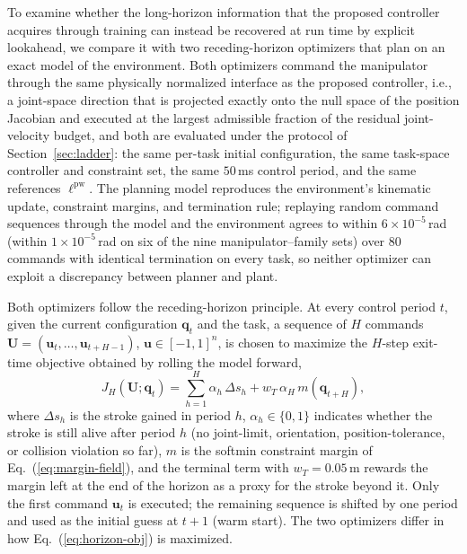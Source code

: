 \documentclass[journal, twoside]{IEEEtran}
\begin{document}
To examine whether the long-horizon information that the proposed
controller acquires through training can instead be recovered at run
time by explicit lookahead, we compare it with two receding-horizon
optimizers that plan on an exact model of the environment. Both
optimizers command the manipulator through the same physically
normalized interface as the proposed controller, i.e., a joint-space
direction that is projected exactly onto the null space of the position
Jacobian and executed at the largest admissible fraction of the residual
joint-velocity budget, and both are evaluated under the protocol of
Section~\ref{sec:ladder}: the same per-task initial configuration, the
same task-space controller and constraint set, the same $50$\,ms control
period, and the same references $\ell^{\mathrm{pw}}$. The planning model
reproduces the environment's kinematic update, constraint margins, and
termination rule; replaying random command sequences through the model
and the environment agrees to within $6\times10^{-5}$\,rad (within
$1\times10^{-5}$\,rad on six of the nine manipulator--family sets) over $80$
commands with identical termination on every task, so neither optimizer
can exploit a discrepancy between planner and plant.

Both optimizers follow the receding-horizon principle. At every control
period $t$, given the current configuration $\mathbf{q}_t$ and the task,
a sequence of $H$ commands
$\mathbf{U}=(\mathbf{u}_t,\ldots,\mathbf{u}_{t+H-1})$,
$\mathbf{u}\in[-1,1]^{n}$, is chosen to maximize the $H$-step exit-time
objective obtained by rolling the model forward,
\begin{equation}
\label{eq:horizon-obj}
J_H(\mathbf{U};\mathbf{q}_t)
=
\sum_{h=1}^{H} \alpha_h\,\Delta s_h
+ w_T\,\alpha_H\, m(\mathbf{q}_{t+H}),
\end{equation}
where $\Delta s_h$ is the stroke gained in period $h$, $\alpha_h\in\{0,1\}$
indicates whether the stroke is still alive after period $h$ (no
joint-limit, orientation, position-tolerance, or collision violation so
far), $m$ is the softmin constraint margin of Eq.~(\ref{eq:margin-field}),
and the terminal term with $w_T=0.05$\,m rewards the margin left at the end
of the horizon as a proxy for the stroke beyond it. Only the first command
$\mathbf{u}_t$ is executed; the remaining sequence is shifted by one
period and used as the initial guess at $t+1$ (warm start). The two
optimizers differ in how Eq.~(\ref{eq:horizon-obj}) is maximized.
\end{document}
